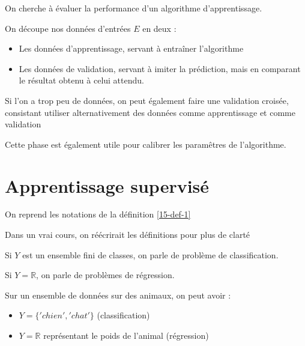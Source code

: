 On cherche à évaluer la performance d'un algorithme d'apprentissage.

\begin{definition}
	On découpe nos données d'entrées $E$ en deux :
	\begin{itemize}
		\item Les données d'apprentissage, servant à entraîner l'algorithme
		\item Les données de validation, servant à imiter la prédiction, mais en comparant le résultat obtenu à celui attendu.
	\end{itemize}
\end{definition}

\begin{rem}
	Si l'on a trop peu de données, on peut également faire une validation croisée, consistant utiliser alternativement des données comme apprentissage et comme validation
\end{rem}

\begin{rem}
	Cette phase est également utile pour calibrer les paramêtres de l'algorithme.
\end{rem}

\section{Apprentissage supervisé}

On reprend les notations de la définition \ref{15-def-1}

\begin{com}
	Dans un vrai cours, on réécrirait les définitions pour plus de clarté
\end{com}

\begin{definition}\enspace
	
	Si $Y$ est un ensemble fini de classes, on parle de problème de classification.
	
	Si $Y =\mathbb R$, on parle de problèmes de régression.
\end{definition}

\begin{example}
	Sur un ensemble de données sur des animaux, on peut avoir : \begin{itemize}
		\item $Y = \{'chien', 'chat'\}$ (classification)
		\item $Y = \mathbb R$ représentant le poids de l'animal (régression)
	\end{itemize}
\end{example}

